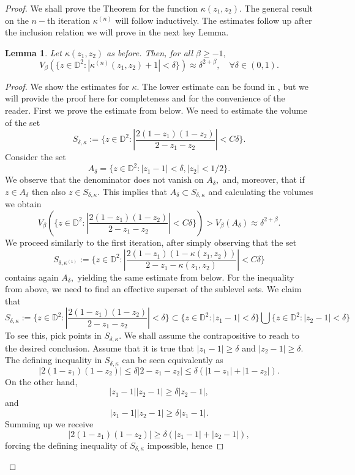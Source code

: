 \documentclass[12pt]{amsart}
\newtheorem{lemma}[theorem]{Lemma}
\numberwithin{equation}{section}
\begin{document}
\begin{proof}
We shall prove the Theorem for the function $\kappa(z_1,z_2).$ The general result on the $n-$th iteration $\kappa^{(n)}$ will follow inductively. The estimates follow up after the inclusion relation we will prove in the next key Lemma.
\begin{lemma} \label{estimate} 
Let $\kappa(z_1,z_2)$ as before. Then, for all $\beta\ge-1,$
$$V_{\beta}\left(\{z\in\mathbb{D}^2:|\kappa^{(n)}(z_1,z_2)+1|<\delta\}\right)\approx \delta^{2+\beta}, \quad \forall{\delta\in(0,1)}.$$
\end{lemma}
\begin{proof}
We show the estimates for $\kappa.$ The lower estimate can be found in \cite{Me2}, but we will provide the proof here for completeness and for the convenience of the reader. First we prove the estimate from below. We need to estimate the volume of the set $$S_{\delta,\kappa}:=\Bigg\{z\in\mathbb{D}^2:\left|\frac{2(1-z_1)(1-z_2)}{2-z_1-z_2}\right|<C\delta\Bigg\}.$$
Consider the set $$A_{\delta}=\Bigg\{z\in\mathbb{D}^2:|z_1-1|<\delta,|z_2|<1/2\Bigg\}.$$ We observe that the denominator does not vanish on $A_{\delta},$ and, moreover, that if $z\in A_{\delta}$ then also $z\in S_{\delta,\kappa}.$
This implies that $A_{\delta}\subset S_{\delta,\kappa}$ and calculating the volumes we obtain
$$V_{\beta}\left(\Bigg\{z\in\mathbb{D}^2:\left|\frac{2(1-z_1)(1-z_2)}{2-z_1-z_2}\right|<C\delta\Bigg\}\right)>V_{\beta}(A_{\delta})\approx \delta^{2+\beta}.$$
We proceed similarly to the first iteration, after simply observing that
the set
$$S_{\delta,\kappa^{(1)}}:=\Bigg\{z\in\mathbb{D}^2:\left|\frac{2(1-z_1)(1-\kappa(z_1,z_2))}{2-z_1-\kappa(z_1,z_2)}\right|<C\delta\Bigg\}$$
contains again $A_{\delta},$ yielding the same estimate from below. For the inequality from above, we need to find an effective superset of the sublevel sets.
We claim that 
$$S_{\delta,\kappa}:=\Bigg\{z\in\mathbb{D}^2:\left|\frac{2(1-z_1)(1-z_2)}{2-z_1-z_2}\right|<\delta\Bigg\}\subset\{z\in\mathbb{D}^2:|z_1-1|<\delta\}\bigcup\{z\in \mathbb{D}^2:|z_2-1|<\delta\}$$
To see this, pick points in $S_{\delta,\kappa}.$ We shall assume the contrapositive to reach to the desired conclusion. Assume that it is true that $|z_1-1|\ge \delta$ and $|z_2-1|\ge \delta.$ The defining inequality in $S_{\delta,\kappa}$ can be seen equivalently as
$$|2(1-z_1)(1-z_2)|\leq \delta|2-z_1-z_2|\leq \delta(|1-z_1|+|1-z_2|).$$
On the other hand, 
$$|z_1-1||z_2-1|\ge \delta|z_2-1|,$$
and
$$|z_1-1||z_2-1|\ge\delta|z_1-1|.$$
Summing up we receive $$|2(1-z_1)(1-z_2)|\ge \delta(|z_1-1|+|z_2-1|),$$
forcing the defining inequality of $S_{\delta,\kappa}$ impossible, hence

\end{proof}
\end{proof}
\end{document}
